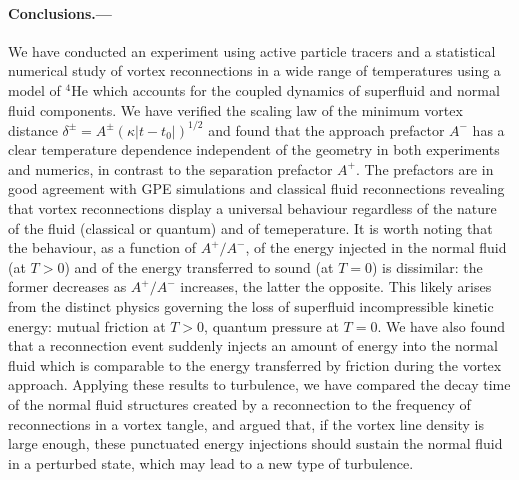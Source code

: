 \documentclass[%
 reprint,
 amsmath,amssymb,
 aps,
 prl,
]{revtex4-2}
\begin{document}
\paragraph*{Conclusions.---} We have conducted an experiment using active particle tracers and a statistical numerical study of vortex reconnections in a wide range of temperatures using a model of $^4$He which accounts for the coupled dynamics of superfluid and normal fluid components.
We have verified the scaling law of the minimum vortex distance 
$\delta^{\pm}=A^{\pm} (\kappa |t-t_0|)^{1/2}$ and found that the approach prefactor $A^-$ has a clear temperature dependence independent of the geometry in both experiments and numerics, in contrast to the
separation prefactor $A^+$. The prefactors are in good agreement
with GPE simulations \cite{villoisIrreversibleDynamicsVortex2020,allen2014} 
and classical fluid reconnections \cite{yaoSeparationScalingViscous2020}
revealing that vortex reconnections display a universal behaviour regardless of the nature
of the fluid (classical or quantum) and of temeperature. It is worth noting that the behaviour, as a function of $A^+/A^-$, of 
the energy injected in the normal fluid (at $T>0$) and of the energy transferred to sound (at $T=0$)
\cite{villoisIrreversibleDynamicsVortex2020,leadbeaterSoundEmissionDue2001b} is dissimilar: the former decreases as $A^+/A^-$
increases, the latter the opposite. This likely arises from the distinct physics governing the loss of superfluid 
incompressible kinetic energy: mutual friction at $T>0$, quantum pressure at $T=0$.
We have also found that a reconnection event suddenly injects an amount of energy 
into the normal fluid which is comparable to the energy transferred by friction
during the vortex approach. Applying these results to turbulence, we have
compared the decay time of the normal fluid structures created by a
reconnection to the frequency of reconnections in a vortex tangle, and argued
that, if the vortex line density is large enough, these punctuated
energy injections should sustain the normal fluid in a perturbed state, which may lead to a new type of turbulence.


% 
\end{document}
